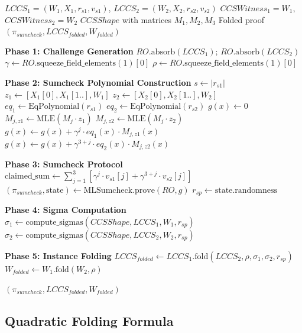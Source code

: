 \documentclass[11pt,a4paper]{article}
\theoremstyle{plain}
\theoremstyle{definition}
\begin{document}
\begin{algorithm}[H]
\caption{HyperNova Multifold: \texttt{prove\_folding()}}
\label{alg:multifold}
\begin{algorithmic}[1]
\Require $LCCS_1 = (W_1, X_1, r_{s1}, v_{s1})$, $LCCS_2 = (W_2, X_2, r_{s2}, v_{s2})$
\Require $CCSWitness_1 = W_1$, $CCSWitness_2 = W_2$
\Require $CCSShape$ with matrices $M_1, M_2, M_3$
\Ensure Folded proof $(\pi_{sumcheck}, LCCS_{folded}, W_{folded})$

\State \textbf{Phase 1: Challenge Generation}
\State $RO.\text{absorb}(LCCS_1)$; $RO.\text{absorb}(LCCS_2)$
\State $\gamma \gets RO.\text{squeeze\_field\_elements}(1)[0]$
\State $\rho \gets RO.\text{squeeze\_field\_elements}(1)[0]$

\State
\State \textbf{Phase 2: Sumcheck Polynomial Construction}
\State $s \gets |r_{s1}|$ 
\State $z_1 \gets [X_1[0], X_1[1..], W_1]$ 
\State $z_2 \gets [X_2[0], X_2[1..], W_2]$
\State $eq_1 \gets \text{EqPolynomial}(r_{s1})$
\State $eq_2 \gets \text{EqPolynomial}(r_{s2})$
\State $g(x) \gets 0$ 
 
    \State $M_{j,z1} \gets \text{MLE}(M_j \cdot z_1)$
    \State $M_{j,z2} \gets \text{MLE}(M_j \cdot z_2)$
    \State $g(x) \gets g(x) + \gamma^j \cdot eq_1(x) \cdot M_{j,z1}(x)$
    \State $g(x) \gets g(x) + \gamma^{3+j} \cdot eq_2(x) \cdot M_{j,z2}(x)$
\EndFor

\State
\State \textbf{Phase 3: Sumcheck Protocol}
\State $\text{claimed\_sum} \gets \sum_{j=1}^{3} [\gamma^j \cdot v_{s1}[j] + \gamma^{3+j} \cdot v_{s2}[j]]$
\State $(\pi_{sumcheck}, \text{state}) \gets \text{MLSumcheck.prove}(RO, g)$
\State $r_{sp} \gets \text{state.randomness}$ 

\State
\State \textbf{Phase 4: Sigma Computation}
\State $\sigma_1 \gets \text{compute\_sigmas}(CCSShape, LCCS_1, W_1, r_{sp})$
\State $\sigma_2 \gets \text{compute\_sigmas}(CCSShape, LCCS_2, W_2, r_{sp})$

\State
\State \textbf{Phase 5: Instance Folding}
\State $LCCS_{folded} \gets LCCS_1.\text{fold}(LCCS_2, \rho, \sigma_1, \sigma_2, r_{sp})$
\State $W_{folded} \gets W_1.\text{fold}(W_2, \rho)$

\State \Return $(\pi_{sumcheck}, LCCS_{folded}, W_{folded})$
\end{algorithmic}
\end{algorithm}

\subsection{Quadratic Folding Formula}
\end{document}
